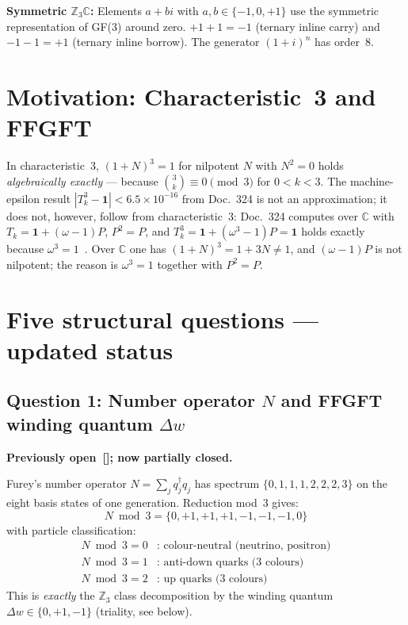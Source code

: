 \vspace{0.5em}
\noindent
\textbf{Symmetric $\mathbb{Z}_3\mathbb{C}$:}
Elements $a+bi$ with $a,b\in\{-1,0,+1\}$ use the symmetric representation
of GF(3) around zero. $+1+1=-1$ (ternary inline carry) and $-1-1=+1$
(ternary inline borrow). The generator $(1+i)^n$ has order~8.

\section{Motivation: Characteristic~3 and FFGFT}

In characteristic~3, $(1+N)^3 = 1$ for nilpotent $N$ with $N^2=0$
holds \emph{algebraically exactly} — because $\binom{3}{k}\equiv 0\pmod{3}$
for $0<k<3$. The machine-epsilon result
$|T_k^3-\mathbf{1}|<6.5\times10^{-16}$ from Doc.~324 is not an
approximation; it does not, however, follow from characteristic~3:
Doc.~324 computes over $\mathbb{C}$ with $T_k = \mathbf{1} + (\omega-1)P$, $P^2 = P$,
and $T_k^3 = \mathbf{1} + (\omega^3-1)P = \mathbf{1}$ holds exactly because $\omega^3 = 1$~\BM. Over $\mathbb{C}$ one has $(1+N)^3 = 1 + 3N \neq 1$, and $(\omega-1)P$ is not nilpotent;
the reason is $\omega^3 = 1$ together with $P^2 = P$.

\section{Five structural questions — updated status}

\subsection{Question 1: Number operator $N$ and FFGFT winding quantum $\Delta w$}

\textbf{Previously open~[\SM]; now partially closed.}

Furey's number operator $N = \sum_j q_j^\dagger q_j$ has spectrum
$\{0,1,1,1,2,2,2,3\}$ on the eight basis states of one generation.
Reduction mod~3 gives:
\begin{equation}
  N\bmod 3 = \{0,+1,+1,+1,-1,-1,-1,0\}
\end{equation}
with particle classification:
\begin{align*}
  N\bmod 3 = 0&: \text{ colour-neutral (neutrino, positron)} \\
  N\bmod 3 = 1&: \text{ anti-down quarks (3 colours)} \\
  N\bmod 3 = 2&: \text{ up quarks (3 colours)}
\end{align*}
This is \emph{exactly} the $\mathbb{Z}_3$ class decomposition by the
winding quantum $\Delta w\in\{0,+1,-1\}$ (triality, see below).

